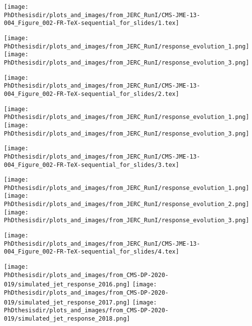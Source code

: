 \begin{frame}[t]
\large
\texttt{[image: \\PhDthesisdir/plots\_and\_images/from\_JERC\_RunI/CMS-JME-13-004\_Figure\_002-FR-TeX-sequential\_for\_slides/1.tex]}

\vfill

\texttt{[image: \\PhDthesisdir/plots\_and\_images/from\_JERC\_RunI/response\_evolution\_1.png]}
\hfill
\texttt{[image: \\PhDthesisdir/plots\_and\_images/from\_JERC\_RunI/response\_evolution\_3.png]}
\end{frame}

\begin{frame}[t]
\addtocounter{framenumber}{-1}
\large
\texttt{[image: \\PhDthesisdir/plots\_and\_images/from\_JERC\_RunI/CMS-JME-13-004\_Figure\_002-FR-TeX-sequential\_for\_slides/2.tex]}

\vfill

\texttt{[image: \\PhDthesisdir/plots\_and\_images/from\_JERC\_RunI/response\_evolution\_1.png]}
\hfill
\texttt{[image: \\PhDthesisdir/plots\_and\_images/from\_JERC\_RunI/response\_evolution\_3.png]}
\end{frame}

\begin{frame}[t]
\addtocounter{framenumber}{-1}
\large
\texttt{[image: \\PhDthesisdir/plots\_and\_images/from\_JERC\_RunI/CMS-JME-13-004\_Figure\_002-FR-TeX-sequential\_for\_slides/3.tex]}

\vfill

\texttt{[image: \\PhDthesisdir/plots\_and\_images/from\_JERC\_RunI/response\_evolution\_1.png]}
\hfill
\texttt{[image: \\PhDthesisdir/plots\_and\_images/from\_JERC\_RunI/response\_evolution\_2.png]}
\hfill
\texttt{[image: \\PhDthesisdir/plots\_and\_images/from\_JERC\_RunI/response\_evolution\_3.png]}
\end{frame}

\begin{frame}[t]
\addtocounter{framenumber}{-1}
\large
\texttt{[image: \\PhDthesisdir/plots\_and\_images/from\_JERC\_RunI/CMS-JME-13-004\_Figure\_002-FR-TeX-sequential\_for\_slides/4.tex]}

\vfill

\texttt{[image: \\PhDthesisdir/plots\_and\_images/from\_CMS-DP-2020-019/simulated\_jet\_response\_2016.png]}
\hfill
\texttt{[image: \\PhDthesisdir/plots\_and\_images/from\_CMS-DP-2020-019/simulated\_jet\_response\_2017.png]}
\hfill
\texttt{[image: \\PhDthesisdir/plots\_and\_images/from\_CMS-DP-2020-019/simulated\_jet\_response\_2018.png]}
\end{frame}

